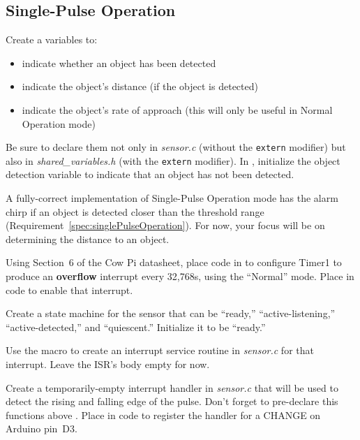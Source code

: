 \subsection{Single-Pulse Operation} \label{subsec:distanceSinglePulseOperation}

Create a variables to:
\begin{itemize}
    \item indicate whether an object has been detected
    \item indicate the object's distance (if the object is detected)
    \item indicate the object's rate of approach (this will only be useful in Normal Operation mode)
\end{itemize}
Be sure to declare them not only in \textit{sensor.c} (without the \lstinline{extern} modifier) but also in \textit{shared\_variables.h} (with the \lstinline{extern} modifier).
In , initialize the object detection variable to indicate that an object has not been detected.

A fully-correct implementation of Single-Pulse Operation mode has the alarm chirp if an object is detected closer than the threshold range (Requirement~\ref{spec:singlePulseOperation}).
For now, your focus will be on determining the distance to an object.

Using Section~6 of the Cow Pi datasheet, place code in  to configure Timer1 to produce an \textbf{overflow} interrupt every 32,768\textmu s, using the ``Normal'' mode.
Place in  code to enable that interrupt.

Create a state machine for the sensor that can be ``ready,'' ``active-listening,'' ``active-detected,'' and ``quiescent.''
Initialize it to be ``ready.''

Use the  macro to create an interrupt service routine in \textit{sensor.c} for that interrupt.
Leave the ISR's body empty for now.

Create a temporarily-empty interrupt handler in \textit{sensor.c} that will be used to detect the rising and falling edge of the pulse. %
Don't forget to pre-declare this functions above .
Place in  code to register the handler for a CHANGE on Arduino pin~D3.

